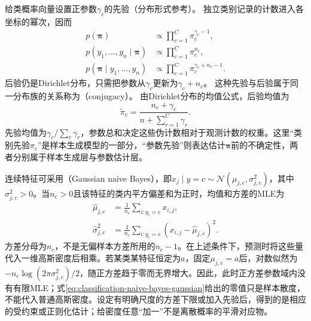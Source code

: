 给类概率向量设置正参数$\gamma_c$的先验（分布形式参考）。
独立类别记录的计数进入各坐标的幂次，因而
\[
  \begin{aligned}
    p(\bm{\pi})
      &\propto\prod_{c=1}^{C}\pi_c^{\gamma_c-1},\\
    p(y_1,\ldots,y_n\mid\bm{\pi})
      &\propto\prod_{c=1}^{C}\pi_c^{n_c},\\
    p(\bm{\pi}\mid y_1,\ldots,y_n)
      &\propto\prod_{c=1}^{C}\pi_c^{\gamma_c+n_c-1}.
  \end{aligned}
\]
后验仍是Dirichlet分布，只需把参数从$\gamma_c$更新为$\gamma_c+n_c$。
这种先验与后验属于同一分布族的关系称为（conjugacy）。
由Dirichlet分布的均值公式，后验均值为
\[
  \tilde\pi_c=\frac{n_c+\gamma_c}
  {n+\sum_{r=1}^{C}\gamma_r}.
\]
先验均值为$\gamma_c/\sum_r\gamma_r$，参数总和决定这些伪计数相对于观测计数的权重。这里“类别先验$\pi_c$”是样本生成模型的一部分，“参数先验”则表达估计$\bm{\pi}$前的不确定性，两者分别属于样本生成层与参数估计层。

连续特征可采用（Gaussian naive Bayes），即$x_j\mid y=c\sim\mathcal{N}(\mu_{j,c},\sigma_{j,c}^{2})$，其中$\sigma_{j,c}^{2}>0$。当$n_c>0$且该特征的类内平方偏差和为正时，均值和方差的MLE为
\begin{equation}
  \label{eq:classification-naive-bayes-gaussian}
  \begin{aligned}
    \hat\mu_{j,c}
      &=\frac{1}{n_c}\sum_{i:y_i=c}x_{i,j},\\
    \hat\sigma_{j,c}^{2}
      &=\frac{1}{n_c}\sum_{i:y_i=c}
        (x_{i,j}-\hat\mu_{j,c})^2.
  \end{aligned}
\end{equation}
方差分母为$n_c$，不是无偏样本方差所用的$n_c-1$。在上述条件下，预测时将这些量代入一维高斯密度后相乘。若某类某特征恒定为$a$，固定$\mu_{j,c}=a$后，对数似然为$-n_c\log(2\pi\sigma_{j,c}^{2})/2$，随正方差趋于零而无界增大。因此，此时正方差参数域内没有有限MLE；式\eqref{eq:classification-naive-bayes-gaussian}给出的零值只是样本散度，不能代入普通高斯密度。设定有明确尺度的方差下限或加入先验后，得到的是相应的受约束或正则化估计；给密度任意“加一”不是离散概率的平滑对应物。

